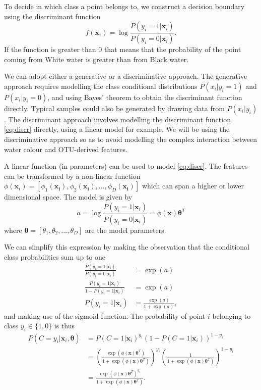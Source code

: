 To decide in which class a point belongs to, we construct a decision boundary using the discriminant function
\begin{equation}
f( \mathbf{x}_i)=\log \frac{P(y_i=1 |  \mathbf{x}_i)}{P(y_i = 0 |  \mathbf{x}_i)}.
\label{eq:discr}
\end{equation}
If the function is greater than $0$ that means that the probability of the point coming from White water is greater than from Black water. 


We can adopt either a generative or a discriminative approach. The generative approach requires modelling the class conditional distributions $P(x_i|y_i = 1)$ and $P(x_i|y_i = 0)$, and using Bayes' theorem to obtain the discriminant function directly. Typical samples could also be generated by drawing data from $P(x_i|y_i)$. The discriminant approach involves modelling the discriminant function \eqref{eq:discr} directly, using a linear model for example. We will be using the discriminative approach so as to avoid modelling the complex interaction between water colour and OTU-derived features.


A linear function (in parameters) can be used to model \eqref{eq:discr}. The features can be transformed by a non-linear function $\phi( \mathbf{x}_i) = [\phi_1( \mathbf{x_i}),\phi_2( \mathbf{x_i}),...,\phi_D( \mathbf{x_i})]$ which can span a higher or lower dimensional space. The model is given by
\begin{equation}
	a = \log \frac{P(y_i=1 |  \mathbf{x}_i)}{P(y_i = 0 |  \mathbf{x}_i)} = \phi( \mathbf{x}) \bm{\theta}^T
\end{equation}
  where $ \bm{\theta} = [\theta_1,\theta_2,...,\theta_D]$ are the model parameters.
  
  We can simplify this expression by making the observation that the conditional class probabilities sum up to one
  \begin{align}
	\frac{P(y_i=1 |  \mathbf{x}_i)}{P(y_i = 0 |  \mathbf{x}_i)} &= \exp(a)\\
	\frac{P(y_i=1 |  \mathbf{x}_i)}{1-P(y_i=1 |  \mathbf{x}_i)} &= \exp(a)\\
	P(y_i=1 |  \mathbf{x}_i) &= \frac{\exp(a)}{1+\exp(a)},
  \end{align}
  and making use of the sigmoid function. The probability of point $i$ belonging to class $y_i \in \{1,0\}$  is thus
    \begin{align}
  	P(C = y_i |  \mathbf{x}_i, \bm{\theta}) &= P(C=1 |  \mathbf{x}_i)^{y_i}(1-P(C=1 |  \mathbf{x}_i))^{1-y_i}\\
	&= \left(\frac{\exp(\phi( \mathbf{x}) \bm{\theta}^T)}{1+\exp(\phi( \mathbf{x}) \bm{\theta}^T)}\right)^{y_i}\left(\frac{1}{1+\exp(\phi( \mathbf{x}) \bm{\theta}^T)}\right)^{1-y_i} \\
	&=\frac{\exp(\phi( \mathbf{x}) \bm{\theta}^T)^{y_i}}{1+\exp(\phi( \mathbf{x}) \bm{\theta}^T)}.
  \end{align}

